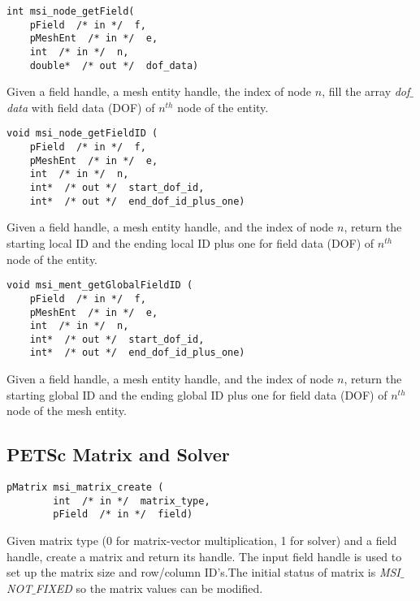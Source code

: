 \begin{verbatim}
int msi_node_getField(
    pField  /* in */  f, 
    pMeshEnt  /* in */  e, 
    int  /* in */  n,
    double*  /* out */  dof_data)
\end{verbatim}\vspace{-.5cm}\hspace{1cm}
Given a field handle, a mesh entity handle, the index of node $n$, fill the array \textit{dof$\_$data} with field data (DOF) of $n^{th}$ node of the entity. 

\begin{verbatim}
void msi_node_getFieldID (
    pField  /* in */  f, 
    pMeshEnt  /* in */  e, 
    int  /* in */  n,
    int*  /* out */  start_dof_id, 
    int*  /* out */  end_dof_id_plus_one)
\end{verbatim}\vspace{-.5cm}\hspace{1cm}
Given a field handle, a mesh entity handle, and the index of node $n$, return the starting local ID and the ending local ID plus one for field data (DOF) of $n^{th}$ node of the entity. 

\begin{verbatim}
void msi_ment_getGlobalFieldID (
    pField  /* in */  f, 
    pMeshEnt  /* in */  e, 
    int  /* in */  n,
    int*  /* out */  start_dof_id, 
    int*  /* out */  end_dof_id_plus_one)
\end{verbatim}\vspace{-.5cm}\hspace{1cm}
Given a field handle, a mesh entity handle, and the index of node $n$, return the starting global ID and the ending global ID plus one for field data (DOF) of $n^{th}$ node of the mesh entity. 

\subsection{PETSc Matrix and Solver}
\begin{verbatim}
pMatrix msi_matrix_create (
        int  /* in */  matrix_type,
        pField  /* in */  field)
\end{verbatim}\vspace{-.5cm}\hspace{1cm}
Given matrix type (0 for matrix-vector multiplication, 1 for solver) and a field handle, create a matrix and return its handle. The input field handle is used to set up the matrix size  and row/column ID's.The initial status of matrix is \textit{MSI$\_$NOT$\_$FIXED} so the matrix values can be modified.

